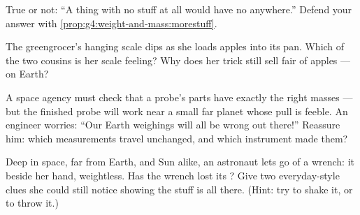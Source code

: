 \begin{exercise}[$\star$]\label{exo:g4:weight-and-mass:8}
True or not: ``A thing with no stuff at all would have no 
anywhere.'' Defend your answer with
\cref{prop:g4:weight-and-mass:morestuff}.
\end{exercise}

\begin{exercise}[$\star$]\label{exo:g4:weight-and-mass:9}
The greengrocer's hanging scale dips as she loads apples into its
pan. Which of the two cousins is her scale feeling? Why does her
trick still sell fair  of apples --- on Earth?
\end{exercise}

\begin{exercise}[$\star\star$]\label{exo:g4:weight-and-mass:10}
A space agency must check that a probe's parts have exactly the
right masses --- but the finished probe will work near a small far
planet whose pull is feeble. An engineer worries: ``Our Earth
weighings will all be wrong out there!'' Reassure him: which
measurements travel unchanged, and which instrument made them?
\end{exercise}

\begin{exercise}[$\star\star$]\label{exo:g4:weight-and-mass:11}
Deep in space, far from Earth,  and Sun alike, an astronaut
lets go of a wrench: it  beside her hand, weightless. Has the
wrench lost its ? Give two everyday-style clues she could still
notice showing the stuff is all there. (Hint: try to shake it, or
to throw it.)
\end{exercise}
